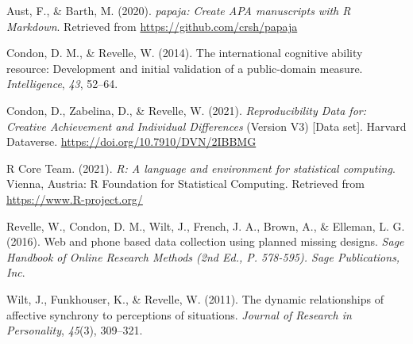 \documentclass[
  english,
  man]{apa6}
\newlength{\cslhangindent}
\newlength{\cslentryspacingunit} %
\newenvironment{CSLReferences}[2] %
 {%
  \setlength{\parindent}{0pt}
  \ifodd #1
  \let\oldpar\par
  \def\par{\hangindent=\cslhangindent\oldpar}
  \fi
  \setlength{\parskip}{#2\cslentryspacingunit}
 }%
 {}
\begin{document}
\hypertarget{refs}{}
\begin{CSLReferences}{1}{0}
\leavevmode{}%
Aust, F., \& Barth, M. (2020). \emph{{papaja}: {Create} {APA} manuscripts with {R Markdown}}. Retrieved from \url{https://github.com/crsh/papaja}

\leavevmode{}%
Condon, D. M., \& Revelle, W. (2014). The international cognitive ability resource: Development and initial validation of a public-domain measure. \emph{Intelligence}, \emph{43}, 52--64.

\leavevmode{}%
Condon, D., Zabelina, D., \& Revelle, W. (2021). \emph{{Reproducibility Data for: Creative Achievement and Individual Differences}} (Version V3) {[}Data set{]}. Harvard Dataverse. \url{https://doi.org/10.7910/DVN/2IBBMG}

\leavevmode{}%
R Core Team. (2021). \emph{R: A language and environment for statistical computing}. Vienna, Austria: R Foundation for Statistical Computing. Retrieved from \url{https://www.R-project.org/}

\leavevmode{}%
Revelle, W., Condon, D. M., Wilt, J., French, J. A., Brown, A., \& Elleman, L. G. (2016). Web and phone based data collection using planned missing designs. \emph{Sage Handbook of Online Research Methods (2nd Ed., P. 578-595). Sage Publications, Inc}.

\leavevmode{}%
Wilt, J., Funkhouser, K., \& Revelle, W. (2011). The dynamic relationships of affective synchrony to perceptions of situations. \emph{Journal of Research in Personality}, \emph{45}(3), 309--321.

\end{CSLReferences}

\endgroup
\end{document}
